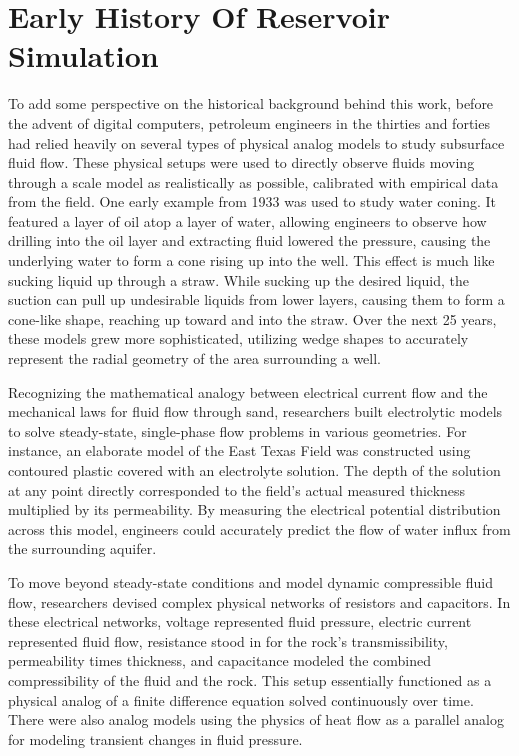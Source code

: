 \section{Early History Of Reservoir Simulation}

To add some perspective on the historical background behind this work, before the advent of digital computers, petroleum engineers in the thirties and forties had relied heavily on several types of physical analog models to study subsurface fluid flow. These physical setups were used to directly observe fluids moving through a scale model as realistically as possible, calibrated with empirical data from the field. One early example from 1933 was used to study water coning. It featured a layer of oil atop a layer of water, allowing engineers to observe how drilling into the oil layer and extracting fluid lowered the pressure, causing the underlying water to form a cone rising up into the well. This effect is much like sucking liquid up through a straw. While sucking up the desired liquid, the suction can pull up undesirable liquids from lower layers, causing them to form a cone-like shape, reaching up toward and into the straw. Over the next 25 years, these models grew more sophisticated, utilizing wedge shapes to accurately represent the radial geometry of the area surrounding a well.

Recognizing the mathematical analogy between electrical current flow and the mechanical laws for fluid flow through sand, researchers built electrolytic models to solve steady-state, single-phase flow problems in various geometries. For instance, an elaborate model of the East Texas Field was constructed using contoured plastic covered with an electrolyte solution. The depth of the solution at any point directly corresponded to the field's actual measured thickness multiplied by its permeability. By measuring the electrical potential distribution across this model, engineers could accurately predict the flow of water influx from the surrounding aquifer.

To move beyond steady-state conditions and model dynamic compressible fluid flow, researchers devised complex physical networks of resistors and capacitors. In these electrical networks, voltage represented fluid pressure, electric current represented fluid flow, resistance stood in for the rock's transmissibility, permeability times thickness, and capacitance modeled the combined compressibility of the fluid and the rock. This setup essentially functioned as a physical analog of a finite difference equation solved continuously over time. There were also analog models using the physics of heat flow as a parallel analog for modeling transient changes in fluid pressure.

